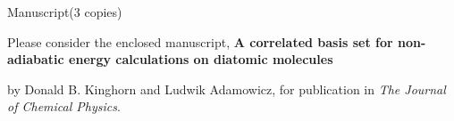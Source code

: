 \documentclass[12pt]{article}
\begin{document}
\begin{lettercc}
\end{lettercc}

\begin{letterencl}
Manuscript(3 copies)
\end{letterencl}

\begin{letteropening}
\end{letteropening}

Please consider the enclosed manuscript, \textbf{A correlated basis set for
non-adiabatic energy calculations on diatomic molecules }

by Donald B. Kinghorn and Ludwik Adamowicz, for publication in \emph{The
Journal of Chemical Physics}.
\end{document}
